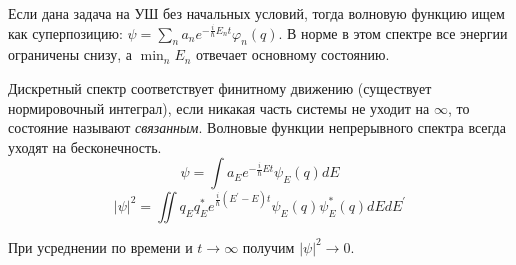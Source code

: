 \par Если дана задача на УШ без начальных условий, тогда волновую функцию ищем как суперпозицию: $\psi = \sum_n a_n e^{-\frac{i}{\hbar}E_n t}\varphi_n (q)$. В норме в этом спектре все энергии ограничены снизу, а $\min_{n} E_n$ отвечает основному состоянию.
\par Дискретный спектр соответствует финитному движению (существует нормировочный интеграл), если никакая часть системы не уходит на $\infty$, то состояние называют \textit{связанным}. Волновые функции непрерывного спектра всегда уходят на бесконечность.
$$\psi = \int a_E e^{-\frac{i}{\hbar}Et} \psi_E(q)dE $$
$$|\psi|^2=\iint q_E q^*_E e^{\frac{i}{\hbar}(E^\prime-E)t} \psi_E(q) \psi^*_E(q) dE dE^\prime $$
\par При усреднении по времени и $t \rightarrow \infty$ получим $|\psi|^2 \rightarrow 0 $.